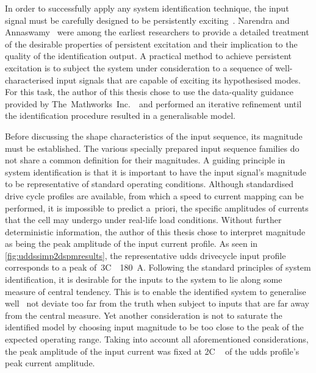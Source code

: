 
In order  to successfully apply  any system identification technique,  the input
signal must be carefully  designed to be persistently exciting~\cite{Ljung1999}.
Narendra and Annaswamy~\cite{Narendra1984,Narendra1987}  were among the earliest
researchers  to provide  a detailed  treatment  of the  desirable properties  of
persistent excitation and their implication to the quality of the identification
output. A  practical method to achieve  persistent excitation is to  subject the
system under  consideration to  a sequence  of well-characterised  input signals
that  are  capable of  exciting  its  hypothesised  modes.  For this  task,  the
author  of this  thesis  chose  to use  the  data-quality  guidance provided  by
The~Mathworks~Inc.~\cite{mathworkssysid}\ and performed  an iterative refinement
until the identification procedure resulted in a generalisable model.

Before discussing the shape characteristics of the input sequence, its magnitude
must be established.  The various specially prepared input  sequence families do
not  share a  common definition  for their  magnitudes. A  guiding principle  in
system  identification is  that  it  is important  to  have  the input  signal's
magnitude  to  be  representative  of standard  operating  conditions.  Although
standardised  drive  cycle  profiles  are  available,  from  which  a  speed  to
current mapping  can be  performed, it  is impossible  to predict  a~priori, the
specific  amplitudes of  currents  that  the cell  may  undergo under  real-life
load  conditions.  Without  further  deterministic information,  the  author  of
this  thesis  chose to  interpret  magnitude  as  being  the peak  amplitude  of
the  input  current profile.  As  seen  in \cref{fig:uddssimp2dspmresults},  the
representative  \gls{udds}  drivecycle  input  profile  corresponds  to  a  peak
of~3C~\ie~\SI{180}{\ampere}.  Following   the  standard  principles   of  system
identification, it is desirable  for the inputs to the system  to lie along some
measure  of  central tendency.  This  is  to  enable  the identified  system  to
generalise well  \ie~not deviate too far  from the truth when  subject to inputs
that are far away from the central  measure. Yet another consideration is not to
saturate the identified model by choosing input magnitude to be too close to the
peak of  the expected  operating range. Taking  into account  all aforementioned
considerations,  the  peak amplitude  of  the  input  current  was fixed  at  2C
\ie~ of the \gls{udds} profile's peak current amplitude.

